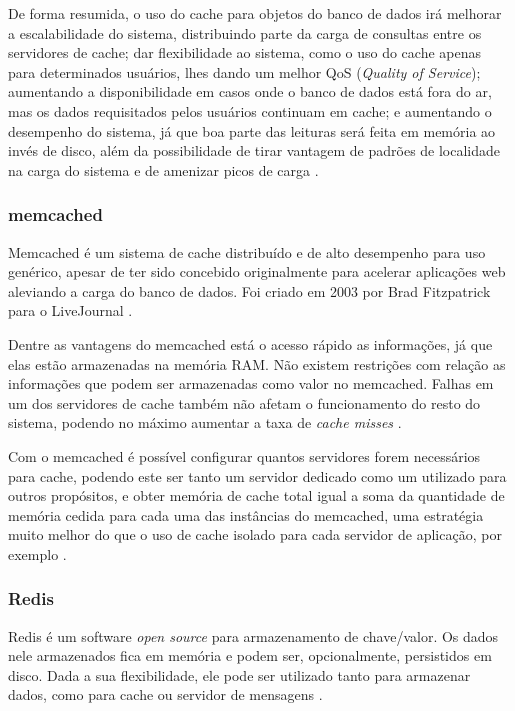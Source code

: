 \documentclass[diss]{template/setrem}
\begin{document}
De forma resumida, o uso do cache para objetos do banco de dados irá melhorar a escalabilidade do sistema, distribuindo parte da carga de consultas entre os servidores de cache; dar flexibilidade ao sistema, como o uso do cache apenas para determinados usuários, lhes dando um melhor QoS (\emph{Quality of Service}); aumentando a disponibilidade em casos onde o banco de dados está fora do ar, mas os dados requisitados pelos usuários continuam em cache; e aumentando o desempenho do sistema, já que boa parte das leituras será feita em memória ao invés de disco, além da possibilidade de tirar vantagem de padrões de localidade na carga do sistema e de amenizar picos de carga \citep{Luo2002}.

\subsubsection{memcached}
Memcached é um sistema de cache distribuído e de alto desempenho para uso genérico, apesar de ter sido concebido originalmente para acelerar aplicações web aleviando a carga do banco de dados. Foi criado em 2003 por Brad Fitzpatrick para o LiveJournal \citep{Memcached2012}.

Dentre as vantagens do memcached está o acesso rápido as informações, já que elas estão armazenadas na memória RAM. Não existem restrições com relação as informações que podem ser armazenadas como valor no memcached. Falhas em um dos servidores de cache também não afetam o funcionamento do resto do sistema, podendo no máximo aumentar a taxa de \emph{cache misses} \citep{MySQL2012}.

Com o memcached é possível configurar quantos servidores forem necessários para cache, podendo este ser tanto um servidor dedicado como um utilizado para outros propósitos, e obter memória de cache total igual a soma da quantidade de memória cedida para cada uma das instâncias do memcached, uma estratégia muito melhor do que o uso de cache isolado para cada servidor de aplicação, por exemplo \citep{Memcached2012}.

\subsubsection{Redis}
Redis é um software \emph{open source} para armazenamento de chave/valor. Os dados nele armazenados fica em memória e podem ser, opcionalmente, persistidos em disco. Dada a sua flexibilidade, ele pode ser utilizado tanto para armazenar dados, como para cache ou servidor de mensagens \citep{Redis2012, Sanfilippo2010}.
\end{document}
